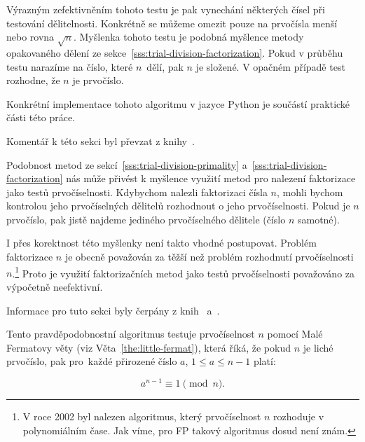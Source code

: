 \documentclass[
  program=infoi,
  biblatex=false,
  figures=true,
  glossaries,
  tables=false,
  sourcecodes=true,
  index
]{kidiplom}
\begin{document}
            Výrazným zefektivněním tohoto testu je pak vynechání některých čísel při testování dělitelnosti.
            Konkrétně se můžeme omezit pouze na prvočísla menší nebo rovna $\sqrt{n}$.
            Myšlenka tohoto testu je podobná myšlence metody opakovaného dělení ze sekce~\ref{sss:trial-division-factorization}.
            Pokud v průběhu testu narazíme na číslo, které $n$~dělí, pak $n$ je složené.
            V opačném případě test rozhodne, že $n$ je prvočíslo.

            Konkrétní implementace tohoto algoritmu v jazyce Python je součástí praktické části této práce.



            Komentář k této sekci byl převzat z knihy~\cite{primes-and-factorization}.

            Podobnost metod ze sekcí~\ref{sss:trial-division-primality} a~\ref{sss:trial-division-factorization}
            nás může přivést k myšlence využití metod pro nalezení faktorizace jako testů prvočíselnosti.
            Kdybychom nalezli faktorizaci čísla $n$, mohli bychom kontrolou jeho prvočíselných dělitelů rozhodnout o jeho prvočíselnosti.
            Pokud je $n$ prvočíslo, pak jistě najdeme jediného prvočíselného dělitele (číslo $n$ samotné).

            I přes korektnost této myšlenky není takto vhodné postupovat.
            Problém faktorizace $n$ je obecně považován za těžší než problém rozhodnutí prvočíselnosti $n$.\footnote{V roce 2002 byl
            nalezen algoritmus, který prvočíselnost $n$ rozhoduje v polynomiálním čase.
            Jak víme, pro FP takový algoritmus dosud není znám.}
            Proto je využití faktorizačních metod jako testů prvočíselnosti považováno za výpočetně neefektivní.



            Informace pro tuto sekci byly čerpány z knih~\cite{handbook} a~\cite{primes-and-factorization}.

            Tento pravděpodobnostní algoritmus testuje prvočíselnost $n$ pomocí
            Malé Fermatovy věty (viz Věta~\ref{the:little-fermat}), která říká, že pokud $n$ je
            liché prvočíslo, pak pro~každé přirozené číslo $a$, $1 \leq a \leq n-1$ platí:

            \begin{equation}\label{eq:little-fermat}
                a^{n-1} \equiv 1 \pmod{n}.
            \end{equation}
\end{document}
